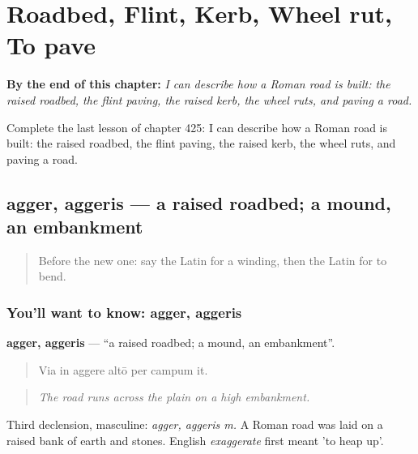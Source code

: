 
\chapter{Roadbed, Flint, Kerb, Wheel rut, To pave}
\label{ch:la-roadbed-flint-kerb-wheel-rut-to-pave}

\begin{chapteropening}
\textbf{By the end of this chapter:} \emph{I can describe how a Roman road is built: the raised roadbed, the flint paving, the raised kerb, the wheel ruts, and paving a road.}

Complete the last lesson of chapter 425: I can describe how a Roman road is built: the raised roadbed, the flint paving, the raised kerb, the wheel ruts, and paving a road.
\end{chapteropening}

\section[agger, aggeris]{agger, aggeris — a raised roadbed; a mound, an embankment}

\label{lesson:LA-C425-agger}



\begin{quote}
Before the new one: say the Latin for a winding, then the Latin for to bend.
\end{quote}

\subsection*{You'll want to know: agger, aggeris}
\textbf{agger, aggeris} — \textquotedblleft{}a raised roadbed; a mound, an embankment\textquotedblright{}.

\begin{quote}
Via in aggere altō per campum it.
\end{quote}

\begin{quote}
\emph{The road runs across the plain on a high embankment.}
\end{quote}

Third declension, masculine: \emph{agger, aggeris m.} A Roman road was laid on a raised bank of earth and stones. English \emph{exaggerate} first meant 'to heap up'.

